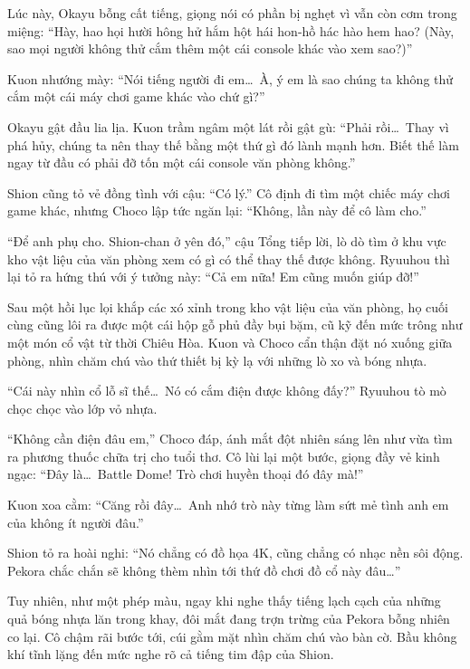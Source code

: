\documentclass[../main.tex]{subfiles}
\begin{document}
Lúc này, Okayu bỗng cất tiếng, giọng nói có phần bị nghẹt vì vẫn còn cơm trong miệng: ``Hày, hao họi hười hông hử hắm hột hái hon-hồ hác hào hem hao? (Này, sao mọi người không thử cắm thêm một cái console khác vào xem sao?)''

Kuon nhướng mày: ``Nói tiếng người đi em\dots\ À, ý em là sao chúng ta không thử cắm một cái máy chơi game khác vào chứ gì?''

Okayu gật đầu lia lịa. Kuon trầm ngâm một lát rồi gật gù: ``Phải rồi\dots\ Thay vì phá hủy, chúng ta nên thay thế bằng một thứ gì đó lành mạnh hơn. Biết thế làm ngay từ đầu có phải đỡ tốn một cái console văn phòng không.''

Shion cũng tỏ vẻ đồng tình với cậu: ``Có lý.'' Cô định đi tìm một chiếc máy chơi game khác, nhưng Choco lập tức ngăn lại: ``Không, lần này để cô làm cho.''

``Để anh phụ cho. Shion-chan ở yên đó,'' cậu Tổng tiếp lời, lò dò tìm ở khu vực kho vật liệu của văn phòng xem có gì có thể thay thế được không. Ryuuhou thì lại tỏ ra hứng thú với ý tưởng này: ``Cả em nữa! Em cũng muốn giúp đỡ!''

\ct

Sau một hồi lục lọi khắp các xó xỉnh trong kho vật liệu của văn phòng, họ cuối cùng cũng lôi ra được một cái hộp gỗ phủ đầy bụi bặm, cũ kỹ đến mức trông như một món cổ vật từ thời Chiêu Hòa. Kuon và Choco cẩn thận đặt nó xuống giữa phòng, nhìn chăm chú vào thứ thiết bị kỳ lạ với những lò xo và bóng nhựa.


``Cái này nhìn cổ lỗ sĩ thế\dots\ Nó có cắm điện được không đấy?'' Ryuuhou tò mò chọc chọc vào lớp vỏ nhựa.

``Không cần điện đâu em,'' Choco đáp, ánh mắt đột nhiên sáng lên như vừa tìm ra phương thuốc chữa trị cho tuổi thơ. Cô lùi lại một bước, giọng đầy vẻ kinh ngạc: ``Đây là\dots\ Battle Dome! Trò chơi huyền thoại đó đây mà!''

Kuon xoa cằm: ``Căng rồi đây\dots\ Anh nhớ trò này từng làm sứt mẻ tình anh em của không ít người đâu.''

Shion tỏ ra hoài nghi: ``Nó chẳng có đồ họa 4K, cũng chẳng có nhạc nền sôi động. Pekora chắc chắn sẽ không thèm nhìn tới thứ đồ chơi đồ cổ này đâu\dots''

Tuy nhiên, như một phép màu, ngay khi nghe thấy tiếng lạch cạch của những quả bóng nhựa lăn trong khay, đôi mắt đang trợn trừng của Pekora bỗng nhiên co lại. Cô chậm rãi bước tới, cúi gằm mặt nhìn chăm chú vào bàn cờ. Bầu không khí tĩnh lặng đến mức nghe rõ cả tiếng tim đập của Shion.
\end{document}

